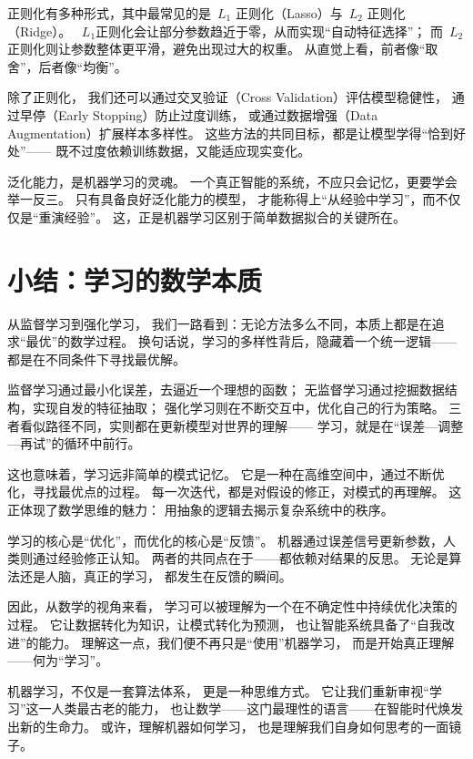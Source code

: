 正则化有多种形式，其中最常见的是~$L_1$ 正则化（Lasso）与~$L_2$ 正则化（Ridge）。  
~$L_1$正则化会让部分参数趋近于零，从而实现“自动特征选择”；  
而~$L_2$ 正则化则让参数整体更平滑，避免出现过大的权重。  
从直觉上看，前者像“取舍”，后者像“均衡”。

除了正则化，  
我们还可以通过交叉验证（Cross Validation）评估模型稳健性，  
通过早停（Early Stopping）防止过度训练，  
或通过数据增强（Data Augmentation）扩展样本多样性。  
这些方法的共同目标，都是让模型学得“恰到好处”——  
既不过度依赖训练数据，又能适应现实变化。

泛化能力，是机器学习的灵魂。  
一个真正智能的系统，不应只会记忆，更要学会举一反三。  
只有具备良好泛化能力的模型，  
才能称得上“从经验中学习”，而不仅仅是“重演经验”。  
这，正是机器学习区别于简单数据拟合的关键所在。

\section{小结：学习的数学本质}

从监督学习到强化学习，  
我们一路看到：无论方法多么不同，本质上都是在追求“最优”的数学过程。  
换句话说，学习的多样性背后，隐藏着一个统一逻辑——  
都是在不同条件下寻找最优解。

监督学习通过最小化误差，去逼近一个理想的函数；  
无监督学习通过挖掘数据结构，实现自发的特征抽取；  
强化学习则在不断交互中，优化自己的行为策略。  
三者看似路径不同，实则都在更新模型对世界的理解——  
学习，就是在“误差—调整—再试”的循环中前行。

这也意味着，学习远非简单的模式记忆。  
它是一种在高维空间中，通过不断优化，寻找最优点的过程。  
每一次迭代，都是对假设的修正，对模式的再理解。  
这正体现了数学思维的魅力：  
用抽象的逻辑去揭示复杂系统中的秩序。

学习的核心是“优化”，而优化的核心是“反馈”。  
机器通过误差信号更新参数，人类则通过经验修正认知。  
两者的共同点在于——都依赖对结果的反思。  
无论是算法还是人脑，真正的学习，  
都发生在反馈的瞬间。

因此，从数学的视角来看，  
学习可以被理解为一个在不确定性中持续优化决策的过程。  
它让数据转化为知识，让模式转化为预测，  
也让智能系统具备了“自我改进”的能力。  
理解这一点，我们便不再只是“使用”机器学习，  
而是开始真正理解——何为“学习”。

机器学习，不仅是一套算法体系，  
更是一种思维方式。  
它让我们重新审视“学习”这一人类最古老的能力，  
也让数学——这门最理性的语言——在智能时代焕发出新的生命力。  
或许，理解机器如何学习，  
也是理解我们自身如何思考的一面镜子。

\nocite{*}
\newpage
